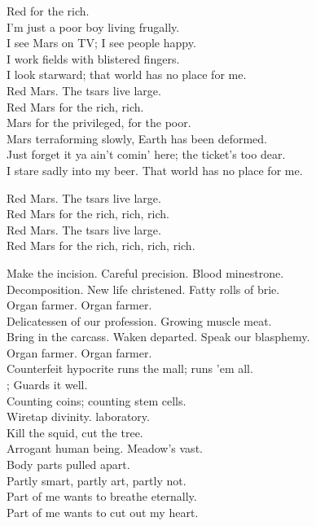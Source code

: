
Red  for the rich. \\

I'm just a poor boy living frugally. \\
I see Mars on TV; I see people happy. \\
I work fields with blistered fingers. \\
I look starward; that world has no place for me. \\

Red Mars. The tsars live large. \\
Red Mars for the rich, rich. \\

Mars for the privileged,  for the poor. \\
Mars terraforming slowly, Earth has been deformed. \\
Just forget it ya ain't comin' here; the ticket's too dear. \\
I stare sadly into my beer. That world has no place for me.

Red Mars. The tsars live large. \\
Red Mars for the rich, rich, rich. \\
Red Mars. The tsars live large. \\
Red Mars for the rich, rich, rich, rich. \\




Make the incision. Careful precision. Blood minestrone. \\
Decomposition. New life christened. Fatty rolls of brie. \\

Organ farmer. Organ farmer. \\

Delicatessen of our profession. Growing muscle meat. \\
Bring in the carcass. Waken departed. Speak our blasphemy. \\

Organ farmer. Organ farmer. \\

Counterfeit hypocrite runs the mall; runs 'em all. \\
; Guards it well. \\
Counting coins; counting stem cells. \\
Wiretap divinity.  laboratory. \\
Kill the squid, cut the tree. \\
Arrogant human being. Meadow's vast. \\
Body parts pulled apart. \\
Partly smart, partly art, partly not. \\
Part of me wants to breathe eternally. \\
Part of me wants to cut out my heart. \\

